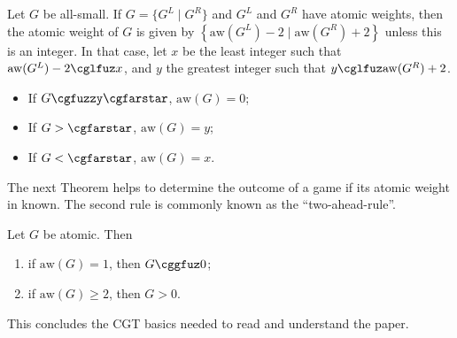 \documentclass[oneside,reqno]{amsart}
\newcommand{\aw}{\mathrm{aw}}
\begin{document}
    \begin{theorem}\label{thm: compute aw}
        Let $G$ be all-small. If $G=\{G^L\mid G^R\}$ and $G^L$ and $G^R$ have atomic weights, then the atomic weight of $G$ is given by $\left\{ \aw(G^L)-2\mid\aw(G^R)+2\right\}$ unless this is an integer. In that case, let $x$ be the least integer such that $\aw(G^L)-2\cglfuz x$, and $y$ the greatest integer such that $y\cglfuz \aw(G^R)+2$.
        \begin{itemize}
            \item If $G\cgfuzzy \cgfarstar$, $\aw(G)=0$;
            \item If $G>\cgfarstar$, $\aw(G)=y$;
            \item If $G<\cgfarstar$, $\aw(G)=x$.
        \end{itemize}
    \end{theorem}

The next Theorem helps to determine the outcome of a game if its atomic weight in known. The second rule is commonly known as the ``two-ahead-rule''.

\begin{theorem}\label{thm: outcome using aw}
    Let $G$ be atomic. Then
    \begin{enumerate}
        \item if $\aw(G)=1$, then $G\cggfuz 0$;
        \item if $\aw(G)\ge 2$, then $G>0$.
    \end{enumerate}
\end{theorem}
This concludes the CGT basics needed to read and understand the paper.


\end{document}
